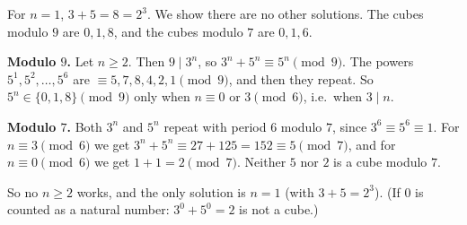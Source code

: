 For $n=1$, $3+5=8=2^3$. We show there are no other solutions. The cubes modulo $9$ are $0,1,8$, and the cubes modulo $7$ are $0,1,6$.

\textbf{Modulo $9$.} Let $n\ge2$. Then $9\mid3^n$, so $3^n+5^n\equiv5^n\pmod 9$. The powers $5^1,5^2,\dots,5^6$ are $\equiv5,7,8,4,2,1\pmod9$, and then they repeat. So $5^n\in\{0,1,8\}\pmod9$ only when $n\equiv0$ or $3\pmod 6$, i.e.\ when $3\mid n$.

\textbf{Modulo $7$.} Both $3^n$ and $5^n$ repeat with period $6$ modulo $7$, since $3^6\equiv5^6\equiv1$. For $n\equiv3\pmod6$ we get $3^n+5^n\equiv27+125=152\equiv5\pmod7$, and for $n\equiv0\pmod6$ we get $1+1=2\pmod7$. Neither $5$ nor $2$ is a cube modulo $7$.

So no $n\ge2$ works, and the only solution is $\boxed{n=1}$ (with $3+5=2^3$). (If $0$ is counted as a natural number: $3^0+5^0=2$ is not a cube.)
